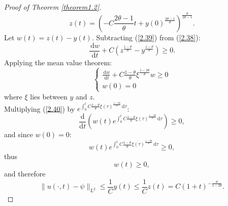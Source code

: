 \documentclass[10pt,a4paper]{amsart}
\begin{document}
\begin{proof}[Proof of Theorem \ref{theorem1.2}]
  $$z(t)=\left(-C\frac{2\theta-1}{\theta}t+y(0)^{\frac{2\theta-1}{\theta}}\right)^{\frac{\theta}{2\theta-1}}.$$
  Let $w(t)=z(t)-y(t)$. Subtracting (\ref{2.39}) from (\ref{2.38}):
  $$\frac{\,\mathrm{d}w}{\,\mathrm{d}t}+C(z^{\frac{1-\theta}{\theta}}-y^{\frac{1-\theta}{\theta}})\ge 0.$$
  Applying the mean value theorem:
  \begin{equation}
      \begin{cases}
          \frac{\,\mathrm{d}w}{\,\mathrm{d}t}+C\frac{1-\theta}{\theta}\xi^{\frac{1-2\theta}{\theta}}w\ge 0 \\
          w(0)=0 \label{2.40}
      \end{cases}
  \end{equation}
  where $\xi$ lies between $y$ and $z$.\\
  Multiplying (\ref{2.40}) by $e^{\int_{0}^{t}C\frac{1-\theta}{\theta}\xi(\tau)^{\frac{1-2\theta}{\theta}}\,\mathrm{d}\tau}$:
  $$\frac{\mathrm{d}}{\mathrm{d}t}\left(w(t)e^{\int_{0}^{t}C\frac{1-\theta}{\theta}\xi(\tau)^{\frac{1-2\theta}{\theta}}\,\mathrm{d}\tau}\right)\ge 0,$$
  and since $w(0)=0$:
  $$w(t)e^{\int_{0}^{t}C\frac{1-\theta}{\theta}\xi(\tau)^{\frac{1-2\theta}{\theta}}\,\mathrm{d}\tau}\ge 0,$$
  thus
  $$w(t)\ge 0,$$
  and therefore
  $$\|u(\cdot,t)-\psi\|_{L^2}\le \frac{1}{C}y(t)\le \frac{1}{C}z(t)=C(1+t)^{-\frac{\theta}{1-2\theta}}.$$


\end{proof}
\end{document}
